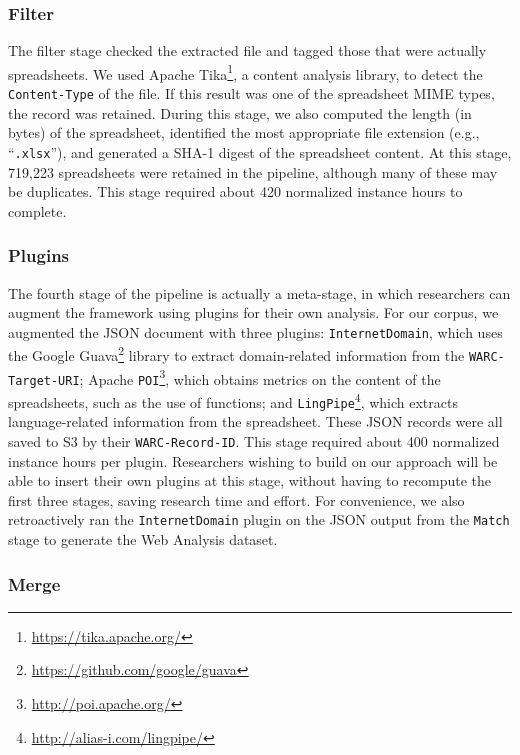 \documentclass[conference]{IEEEtran}
\begin{document}
\subsubsection{Filter}

The filter stage checked the extracted file and tagged those that were actually spreadsheets. We used Apache Tika\footnote{\url{https://tika.apache.org/}}, a content analysis library, to detect the \texttt{Content-Type} of the file. If this result was one of the spreadsheet MIME types, the record was retained. During this stage, we also computed the length (in bytes) of the spreadsheet, identified the most appropriate file extension (e.g., ``\texttt{.xlsx}''), and generated a SHA-1 digest of the spreadsheet content.  At this stage, 719,223 spreadsheets were retained in the pipeline, although many of these may be duplicates. This stage required about 420 normalized instance hours to complete.

\subsubsection{Plugins} 

The fourth stage of the pipeline is actually a meta-stage, in which researchers can augment the framework using plugins for their own analysis. For our corpus, we augmented the JSON document with three plugins: \texttt{InternetDomain}, which uses the Google Guava\footnote{\url{https://github.com/google/guava}} library to extract domain-related information from the \texttt{WARC-Target-URI}; Apache \texttt{POI}\footnote{\url{http://poi.apache.org/}}, which obtains metrics on the content of the spreadsheets, such as the use of functions; and \texttt{LingPipe}\footnote{\url{http://alias-i.com/lingpipe/}}, which extracts language-related information from the spreadsheet. These JSON records were all saved to S3 by their \texttt{WARC-Record-ID}. This stage required about 400 normalized instance hours per plugin. Researchers wishing to build on our approach will be able to insert their own plugins at this stage, without having to recompute the first three stages, saving research time and effort. For convenience, we also retroactively ran the \texttt{InternetDomain} plugin on the JSON output from the \texttt{Match} stage to generate the Web Analysis dataset.

\subsubsection{Merge} 
\end{document}
